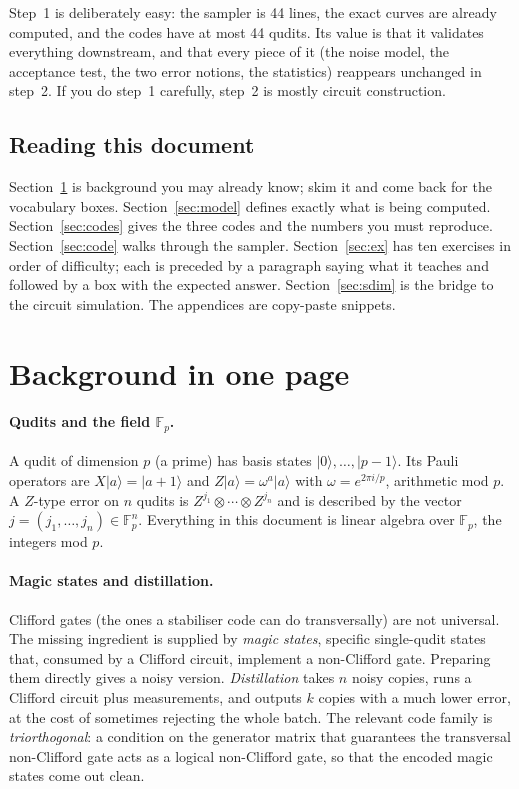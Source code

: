 \documentclass[11pt]{article}
\newcommand{\F}{\mathbb{F}}
\begin{document}
Step~1 is deliberately easy: the sampler is 44 lines, the exact curves are already
computed, and the codes have at most 44 qudits. Its value is that it validates
everything downstream, and that every piece of it (the noise model, the acceptance
test, the two error notions, the statistics) reappears unchanged in step~2. If you
do step~1 carefully, step~2 is mostly circuit construction.

\subsection{Reading this document}

Section~\ref{sec:background} is background you may already know; skim it and come
back for the vocabulary boxes. Section~\ref{sec:model} defines exactly what is being
computed. Section~\ref{sec:codes} gives the three codes and the numbers you must
reproduce. Section~\ref{sec:code} walks through the sampler. Section~\ref{sec:ex}
has ten exercises in order of difficulty; each is preceded by a paragraph saying
what it teaches and followed by a box with the expected answer. Section~\ref{sec:sdim}
is the bridge to the circuit simulation. The appendices are copy-paste snippets.

\section{Background in one page}
\label{sec:background}

\paragraph{Qudits and the field $\F_p$.} A qudit of dimension $p$ (a prime) has
basis states $|0\rangle,\dots,|p-1\rangle$. Its Pauli operators are $X|a\rangle =
|a+1\rangle$ and $Z|a\rangle = \omega^{a}|a\rangle$ with $\omega = e^{2\pi i/p}$,
arithmetic mod $p$. A $Z$-type error on $n$ qudits is $Z^{j_1}\otimes\cdots\otimes
Z^{j_n}$ and is described by the vector $j=(j_1,\dots,j_n)\in\F_p^{n}$. Everything in
this document is linear algebra over $\F_p$, the integers mod $p$.

\paragraph{Magic states and distillation.} Clifford gates (the ones a stabiliser
code can do transversally) are not universal. The missing ingredient is supplied by
\emph{magic states}, specific single-qudit states that, consumed by a Clifford
circuit, implement a non-Clifford gate. Preparing them directly gives a noisy
version. \emph{Distillation} takes $n$ noisy copies, runs a Clifford circuit plus
measurements, and outputs $k$ copies with a much lower error, at the cost of
sometimes rejecting the whole batch. The relevant code family is
\emph{triorthogonal}: a condition on the generator matrix that guarantees the
transversal non-Clifford gate acts as a logical non-Clifford gate, so that the
encoded magic states come out clean.
\end{document}
